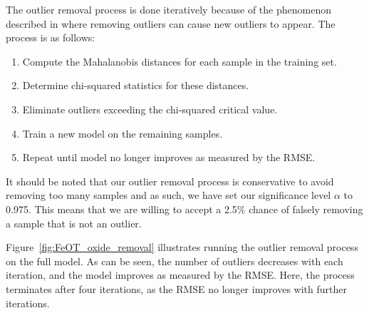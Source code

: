 The outlier removal process is done iteratively because of the phenomenon described in \citet{cleggRecalibrationMarsScience2017} where removing outliers can cause new outliers to appear.
The process is as follows:
\begin{enumerate}
    \item Compute the Mahalanobis distances for each sample in the training set.
    \item Determine chi-squared statistics for these distances.
    \item Eliminate outliers exceeding the chi-squared critical value.
    \item Train a new model on the remaining samples.
    \item Repeat until model no longer improves as measured by the RMSE.
\end{enumerate}

It should be noted that our outlier removal process is conservative to avoid removing too many samples and as such, we have set our significance level $\alpha$ to 0.975.
This means that we are willing to accept a 2.5\% chance of falsely removing a sample that is not an outlier.

Figure~\ref{fig:FeOT_oxide_removal} illustrates running the outlier removal process on the  full model.
As can be seen, the number of outliers decreases with each iteration, and the model improves as measured by the RMSE.
Here, the process terminates after four iterations, as the RMSE no longer improves with further iterations.

